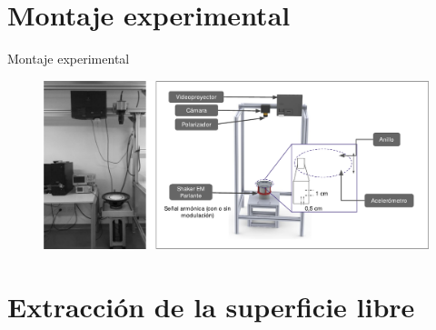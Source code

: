 \documentclass[aspectratio=169]{beamer}
\begin{document}
\section{Montaje experimental}

\begin{frame}{Montaje experimental}
	\begin{figure}[ht]
		\centering
		\includegraphics[width=1\textwidth]{figs/esquema_experimental.pdf}
	\end{figure}
\end{frame}

\section{Extracción de la superficie libre}
\end{document}

